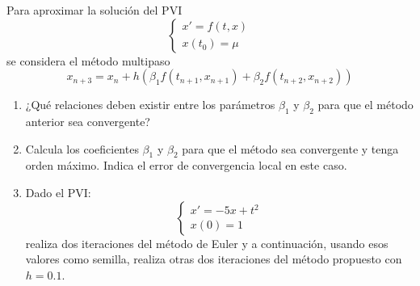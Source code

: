 \begin{ejercicio}
    Para aproximar la solución del PVI
    \begin{equation*}
        \begin{cases}
            x' = f(t, x) \\
            x(t_0) = \mu
        \end{cases}
    \end{equation*}
    se considera el método multipaso
    \begin{equation*}
        x_{n+3} = x_n + h \left( \beta_1 f(t_{n+1}, x_{n+1}) + \beta_2 f(t_{n+2}, x_{n+2}) \right)
    \end{equation*}
    \begin{enumerate}
        \item ¿Qué relaciones deben existir entre los parámetros $\beta_1$ y $\beta_2$ para que el método anterior sea convergente?
        \item Calcula los coeficientes $\beta_1$ y $\beta_2$ para que el método sea convergente y tenga orden máximo. Indica el error de convergencia local en este caso.
        \item Dado el PVI:
            \begin{equation*}
                \begin{cases}
                    x' = -5x + t^2 \\
                    x(0) = 1
                \end{cases}
            \end{equation*}
            realiza dos iteraciones del método de Euler y a continuación, usando esos valores como semilla, realiza otras dos iteraciones del método propuesto con $h = 0.1$.
    \end{enumerate}
\end{ejercicio}


